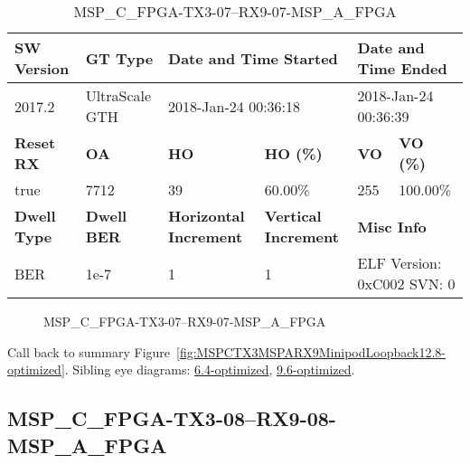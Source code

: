 \begin{table}[h]
\centering
\caption{MSP\_C\_FPGA-TX3-07--RX9-07-MSP\_A\_FPGA}
\label{tab:MSPCFPGATX307RX907MSPAFPGA12.8-optimized}
\begin{tabular}{@{}|l|l|l|l|l|l|@{}}
\toprule
\textbf{SW Version}                & \textbf{GT Type}   & \multicolumn{2}{l|}{\textbf{Date and Time Started}}            & \multicolumn{2}{l|}{\textbf{Date and Time Ended}}        \\ \midrule
2017.2                       & UltraScale GTH          & \multicolumn{2}{l|}{2018-Jan-24 00:36:18}                   & \multicolumn{2}{l|}{2018-Jan-24 00:36:39}               \\ \midrule
\textbf{Reset RX}                  & \textbf{OA} & \textbf{HO}   & \textbf{HO (\%)} & \textbf{VO} & \textbf{VO (\%)} \\ \midrule
true & 7712        & 39          & 60.00\%        & 255        & 100.00\%       \\ \midrule
\textbf{Dwell Type}                & \textbf{Dwell BER} & \textbf{Horizontal Increment} & \textbf{Vertical Increment}    & \multicolumn{2}{l|}{\textbf{Misc Info}}                  \\ \midrule
BER                            & 1e-7        & 1        & 1           & \multicolumn{2}{l|}{ELF Version: 0xC002 SVN: 0}                         \\ \bottomrule
\end{tabular}
\end{table}

\begin{figure}[h]
\caption{MSP\_C\_FPGA-TX3-07--RX9-07-MSP\_A\_FPGA} \label{fig:MSPCFPGATX307RX907MSPAFPGA12.8-optimized}
\end{figure}

Call back to summary Figure~\ref{fig:MSPCTX3MSPARX9MinipodLoopback12.8-optimized}.
Sibling eye diagrams: \hyperref[sec:MSPCFPGATX307RX907MSPAFPGA6.4-optimized]{6.4-optimized}, \hyperref[sec:MSPCFPGATX307RX907MSPAFPGA9.6-optimized]{9.6-optimized}.

\clearpage
\newpage


\subsection{MSP\_C\_FPGA-TX3-08--RX9-08-MSP\_A\_FPGA}\label{sec:MSPCFPGATX308RX908MSPAFPGA12.8-optimized}

